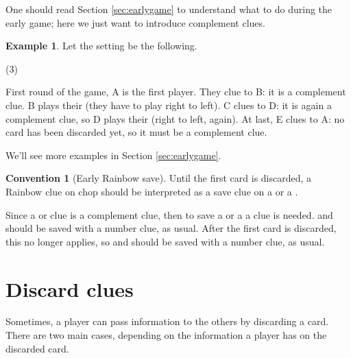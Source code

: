 \documentclass[a4paper]{article}
\theoremstyle{plain}
\theoremstyle{definition}
\newtheorem{example}[theorem]{Example}
\newtheorem{convention}[theorem]{Convention}
\begin{document}
One should read Section \ref{sec:earlygame} to understand what to do during the early game; here we just want to introduce complement clues.

\begin{example}
	
	Let the setting be the following.
	
	\begin{tasks}(3)
		\task[+]      
		\task[A]    
		\task[B]    
		\task[C]    
		\task[D]    
		\task[E]    
	\end{tasks}
	
	First round of the game, A is the first player. They clue  to B: it is a complement clue. B plays their  (they have to play right to left). C clues  to D: it is again a complement clue, so D plays their  (right to left, again). At last, E clues  to A: no card has been discarded yet, so it must be a complement clue.
\end{example}

We'll see more examples in Section \ref{sec:earlygame}.


\begin{convention}[Early Rainbow save]
	Until the first card is discarded, a Rainbow clue on chop should be interpreted as a save clue on a  or a .
\end{convention}

Since a  or  clue is a complement clue, then to save a  or a  a  clue is needed.  and  should be saved with a number clue, as usual. After the first card is discarded, this no longer applies, so  and  should be saved with a number clue, as usual.

\section{Discard clues}

Sometimes, a player can pass information to the others by discarding a card. There are two main cases, depending on the information a player has on the discarded card.

%
%
\end{document}
